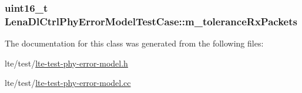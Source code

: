 \subsubsection[{\texorpdfstring{m\+\_\+tolerance\+Rx\+Packets}{m_toleranceRxPackets}}]{\setlength{\rightskip}{0pt plus 5cm}uint16\+\_\+t Lena\+Dl\+Ctrl\+Phy\+Error\+Model\+Test\+Case\+::m\+\_\+tolerance\+Rx\+Packets\hspace{0.3cm}{\ttfamily [private]}}\hypertarget{classLenaDlCtrlPhyErrorModelTestCase_aeea53cbe22fe11495e338820c8bd1515}{}\label{classLenaDlCtrlPhyErrorModelTestCase_aeea53cbe22fe11495e338820c8bd1515}


The documentation for this class was generated from the following files\+:\begin{DoxyCompactItemize}
\item 
lte/test/\hyperlink{lte-test-phy-error-model_8h}{lte-\/test-\/phy-\/error-\/model.\+h}\item 
lte/test/\hyperlink{lte-test-phy-error-model_8cc}{lte-\/test-\/phy-\/error-\/model.\+cc}\end{DoxyCompactItemize}
